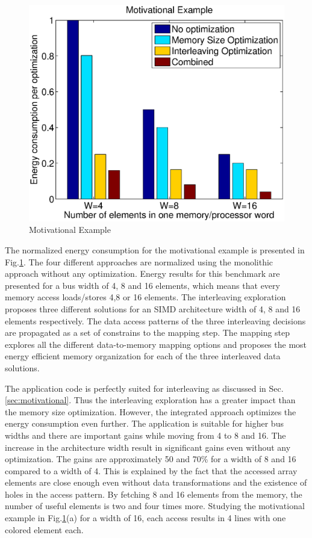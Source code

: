 \documentclass[prodmode,acmtecs]{acmsmall}
\begin{document}
\begin{figure}
\centering
	\includegraphics[scale = 0.5]{Images/Example.eps} 
	\caption{Motivational Example}
	\label{fig:example}
\end{figure}

The normalized energy consumption for the motivational example is presented in Fig.\ref{fig:example}.
The four different approaches are normalized using the monolithic approach without any optimization.
Energy results for this benchmark are presented for a bus width of 4, 8 and 16 elements, which means that every memory access loads/stores 4,8 or 16 elements. 
The interleaving exploration proposes three different solutions for an SIMD architecture width of 4, 8 and 16 elements respectively.
The data access patterns of the three interleaving decisions are propagated as a set of constrains to the mapping step.
The mapping step explores all the different data-to-memory mapping options and proposes the most energy efficient memory organization for each of the three interleaved data solutions.

The application code is perfectly suited for interleaving as discussed in Sec.\ref{sec:motivational}.
Thus the interleaving exploration has a greater impact than the memory size optimization.
However, the integrated approach optimizes the energy consumption even further.
The application is suitable for higher bus widths and there are important gains while moving from 4 to 8 and 16.
The increase in the architecture width result in significant gains even without any optimization.
The gains are approximately 50 and 70\% for a width of 8 and 16 compared to a width of 4.
This is explained by the fact that the accessed array elements are close enough even without data transformations and the existence of holes in the access pattern. 
By fetching 8 and 16 elements from the memory, the number of useful elements is two and four times more.
Studying the motivational example in Fig.\ref{fig:example}(a) for a width of 16, each access results in 4 lines with one colored element each.
\end{document}
